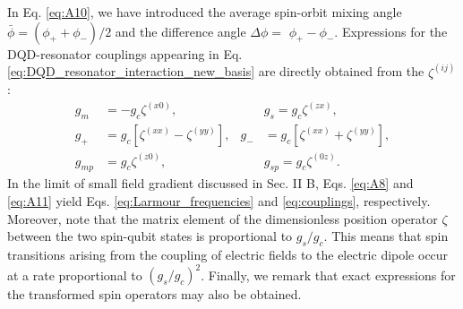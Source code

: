 \documentclass[12pt]{article}
\begin{document}
In Eq. \ref{eq:A10}, we have introduced the average spin-orbit mixing angle $\bar{\phi}=\left(\phi_{+}+\phi_{-}\right) / 2$ and the difference angle $\Delta \phi=$ $\phi_{+}-\phi_{-}$. 
Expressions for the DQD-resonator couplings appearing in Eq. \ref{eq:DQD_resonator_interaction_new_basis} are directly obtained from the $\zeta^{(i j)}$ :
\begin{equation}\label{eq:A11}
    \begin{aligned}
        g_m & =-g_c \zeta^{(x 0)}, & & g_s=g_c \zeta^{(z x)}, \\
        g_{+} & =g_c\left[\zeta^{(x x)}-\zeta^{(y y)}\right], & g_{-} & =g_c\left[\zeta^{(x x)}+\zeta^{(y y)}\right], \\
        g_{m p} & =g_c \zeta^{(z 0)}, & & g_{s p}=g_c \zeta^{(0 z)} .
        \end{aligned}
\end{equation}
In the limit of small field gradient discussed in Sec. II B, Eqs. \ref{eq:A8} and \ref{eq:A11} yield Eqs. \ref{eq:Larmour_frequencies} and \ref{eq:couplings}, respectively. 
Moreover, note that the matrix element of the dimensionless position operator $\zeta$ between the two spin-qubit states is proportional to $g_s / g_c$. 
This means that spin transitions arising from the coupling of electric fields to the electric dipole occur at a rate proportional to $\left(g_s / g_c\right)^2$. 
Finally, we remark that exact expressions for the transformed spin operators may also be obtained.

\printbibliography
\end{document}
